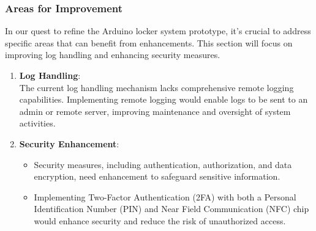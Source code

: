 \subsubsection{Areas for Improvement}

In our quest to refine the Arduino locker system prototype,
 it's crucial to address specific areas that can benefit from enhancements.
  This section will focus on improving log handling and enhancing security measures.

  \begin{enumerate}
    \item \textbf{Log Handling}:\\
    The current log handling mechanism lacks comprehensive remote logging capabilities. Implementing remote logging would enable logs to be sent to an admin or remote server, improving maintenance and oversight of system activities.
    \item \textbf{Security Enhancement}:
    \begin{itemize}
        \item Security measures, including authentication, authorization, and data encryption, need enhancement to safeguard sensitive information.
        \item Implementing Two-Factor Authentication (2FA) with both a Personal Identification Number (PIN) and Near Field Communication (NFC) chip would enhance security and reduce the risk of unauthorized access.
    \end{itemize}
  \end{enumerate}

